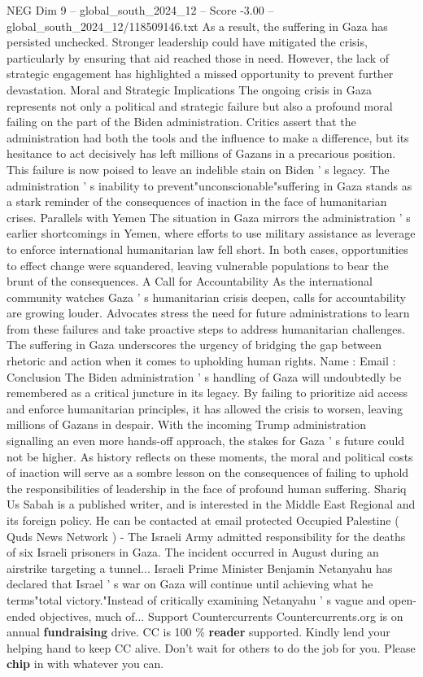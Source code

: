 \begin{textsample}{NEG Dim 9 – global\_south\_2024\_12 – Score -3.00 – global\_south\_2024\_12/118509146.txt}
As a result, the suffering in Gaza has persisted unchecked.
Stronger leadership could have mitigated the crisis, particularly by ensuring that aid reached those in need.
However, the lack of strategic engagement has highlighted a missed opportunity to prevent further devastation.
Moral and Strategic Implications The ongoing crisis in Gaza represents not only a political and strategic failure but also a profound moral failing on the part of the Biden administration.
Critics assert that the administration had both the tools and the influence to make a difference, but its hesitance to act decisively has left millions of Gazans in a precarious position.
This failure is now poised to leave an indelible stain on Biden ' s legacy.
The administration ' s inability to prevent"unconscionable"suffering in Gaza stands as a stark reminder of the consequences of inaction in the face of humanitarian crises.
Parallels with Yemen The situation in Gaza mirrors the administration ' s earlier shortcomings in Yemen, where efforts to use military assistance as leverage to enforce international humanitarian law fell short.
In both cases, opportunities to effect change were squandered, leaving vulnerable populations to bear the brunt of the consequences.
A Call for Accountability As the international community watches Gaza ' s humanitarian crisis deepen, calls for accountability are growing louder.
Advocates stress the need for future administrations to learn from these failures and take proactive steps to address humanitarian challenges.
The suffering in Gaza underscores the urgency of bridging the gap between rhetoric and action when it comes to upholding human rights.
Name : Email : Conclusion The Biden administration ' s handling of Gaza will undoubtedly be remembered as a critical juncture in its legacy.
By failing to prioritize aid access and enforce humanitarian principles, it has allowed the crisis to worsen, leaving millions of Gazans in despair.
With the incoming Trump administration signalling an even more hands-off approach, the stakes for Gaza ' s future could not be higher.
As history reflects on these moments, the moral and political costs of inaction will serve as a sombre lesson on the consequences of failing to uphold the responsibilities of leadership in the face of profound human suffering.
Shariq Us Sabah is a published writer, and is interested in the Middle East Regional and its foreign policy.
He can be contacted at email protected Occupied Palestine ( Quds News Network ) - The Israeli Army admitted responsibility for the deaths of six Israeli prisoners in Gaza.
The incident occurred in August during an airstrike targeting a tunnel...
Israeli Prime Minister Benjamin Netanyahu has declared that Israel ' s war on Gaza will continue until achieving what he terms"total victory."Instead of critically examining Netanyahu ' s vague and open-ended objectives, much of...
Support Countercurrents Countercurrents.org is on annual \textbf{fundraising} drive.
CC is 100 \% \textbf{reader} supported.
Kindly lend your helping hand to keep CC alive.
Don't wait for others to do the job for you.
Please \textbf{chip} in with whatever you can.

\end{textsample}
